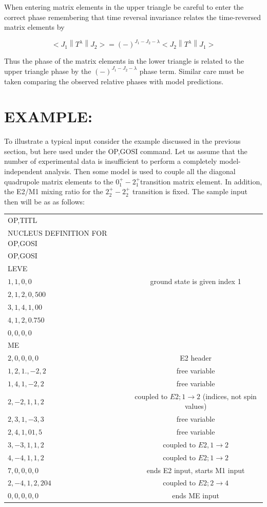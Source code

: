 \documentclass[10pt]{article}
\begin{document}
When entering matrix elements in the upper triangle be careful to enter the correct phase remembering that time reversal invariance relates the time-reversed matrix elements by

$$
<J_{1}\left\|T^{\lambda}\right\| J_{2}>=(-)^{J_{1}-J_{2}-\lambda}<J_{2}\left\|T^{\lambda}\right\| J_{1}>
$$

Thus the phase of the matrix elements in the lower triangle is related to the upper triangle phase by the $(-)^{J_{1}-J_{2}-\lambda}$ phase term. Similar care must be taken comparing the observed relative phases with model predictions.

\section*{EXAMPLE:}
To illustrate a typical input consider the example discussed in the previous section, but here used under the OP,GOSI command. Let us assume that the number of experimental data is insufficient to perform a completely model-independent analysis. Then some model is used to couple all the diagonal quadrupole matrix elements to the $0_{1}^{+}-2_{1}^{+}$transition matrix element. In addition, the E2/M1 mixing ratio for the $2_{2}^{+}-2_{2}^{+}$ transition is fixed. The sample input then will be as as follows:

\begin{center}
\begin{tabular}{lc}
OP,TITL &  \\
NUCLEUS DEFINITION FOR OP,GOSI &  \\
OP,GOSI &  \\
LEVE &  \\
$1,1,0,0$ & ground state is given index 1 \\
$2,1,2,0,500$ &  \\
$3,1,4,1,00$ &  \\
$4,1,2,0.750$ &  \\
$0,0,0,0$ &  \\
ME &  \\
$2,0,0,0,0$ & E2 header \\
$1,2,1 .,-2,2$ & free variable \\
$1,4,1,-2,2$ & free variable \\
$2,-2,1,1,2$ & coupled to $E 2 ; 1 \rightarrow 2$ (indices, not spin values) \\
$2,3,1,-3,3$ & free variable \\
$2,4,1,01,5$ & free variable \\
$3,-3,1,1,2$ & coupled to $E 2,1 \rightarrow 2$ \\
$4,-4,1,1,2$ & coupled to $E 2 ; 1 \rightarrow 2$ \\
$7,0,0,0,0$ & ends E2 input, starts M1 input \\
$2,-4,1,2,204$ & coupled to $E 2 ; 2 \rightarrow 4$ \\
$0,0,0,0,0$ & ends ME input \\
\end{tabular}
\end{center}
\end{document}
